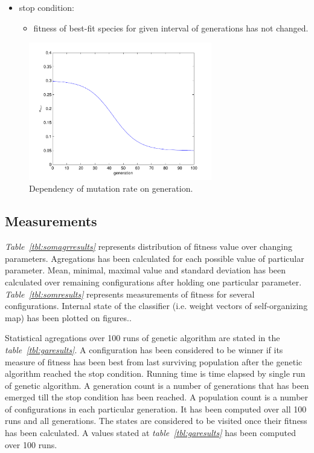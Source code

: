 \documentclass[a4paper,jurnal]{IEEEtran}
\begin{document}
\begin{itemize}
	\item stop condition:
	\begin{itemize}
		\item fitness of best-fit species for given interval of generations has not changed.
	\end{itemize}	
\end{itemize}
\begin{figure}[h]
	\centering
	\includegraphics[width=80mm]{mut_r}
	\caption{Dependency of mutation rate on generation.}
	\label{fig:mut_r}
\end{figure}

\subsection{Measurements}
\textit{Table~\ref{tbl:somagrresults}} represents distribution of fitness value over changing parameters.
Agregations has been calculated for each possible value of particular parameter.
Mean, minimal, maximal value and standard deviation has been calculated over 
remaining configurations after holding one particular parameter. 
\textit{Table~\ref{tbl:somresults}} represents measurements of fitness for several configurations.
Internal state of the classifier (i.e. weight vectors of self-organizing map) 
has been plotted on figures.. %

Statistical agregations over 100 runs of genetic algorithm are stated in the \textit{table~\ref{tbl:garesults}}.
A configuration has been considered to be winner if its measure of fitness has been best from last surviving population
after the genetic algorithm reached the stop condition. Running time is time elapsed by single run of genetic
algorithm. A generation count is a number of generations that has been emerged till the stop condition has been reached.
A population count is a number of configurations in each particular generation. It has been computed over 
all 100 runs and all generations.
The states are considered to be visited once their fitness has been calculated.
A values stated at \textit{table~\ref{tbl:garesults}} has been computed over 100 runs.
\end{document}
